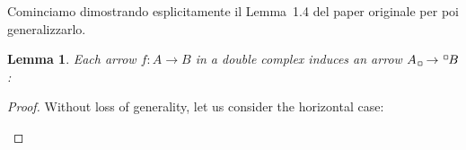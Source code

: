 \documentclass[a4paper]{article}
\newcommand{\bx}{{\kern.15em\line(1,0){3}\line(0,1){3}%
\raisebox{.3em}{\line(-1,0){3}\line(0,-1){3}\kern.3em}}}
\newtheorem{lemma}[theorem]{Lemma}
\begin{document}
Cominciamo dimostrando esplicitamente il Lemma~1.4 del paper originale \cite{bergman2012diagramchasing}
per poi generalizzarlo.

\begin{lemma}
    Each arrow \(f \colon A \to B\) in a double complex induces an arrow \(A_\bx \to {}^\bx B\):
\end{lemma}

\begin{proof}
    Without loss of generality, let us consider the horizontal case:
\begin{figure}[htbp]
        \centering
        \begin{minipage}[b]{0.47\textwidth}
            \centering
            
                        
            \vspace{0.3cm} %
        \end{minipage}%
        \hfill\vrule\hfill%
        \begin{minipage}[b]{0.47\textwidth}
            \centering
            
            

\end{minipage}
\end{figure}
\end{proof}
\end{document}
